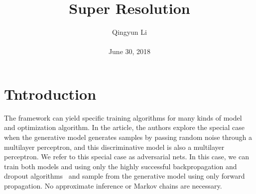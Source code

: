 \documentclass[10pt,twocolumn,letterpaper]{article}
\begin{document}
\author{Qingyun Li\\\\
June 30, 2018}        
\title{Super Resolution}

\maketitle

\section{Tntroduction}
\par The  framework can yield specific training algorithms for many kinds of model and optimization algorithm. In the article, the authors explore the special case when the generative model generates samples by passing random noise through a multilayer perceptron, and this discriminative model is also a multilayer perceptron. We refer to this special case as adversarial nets. In this case, we can train both models and using only the highly successful backpropagation and dropout algorithms~\cite{Hinton2012Improving} and sample from the generative model using only forward propagation. No approximate inference or Markov chains are necessary.
  
 
\end{document}
